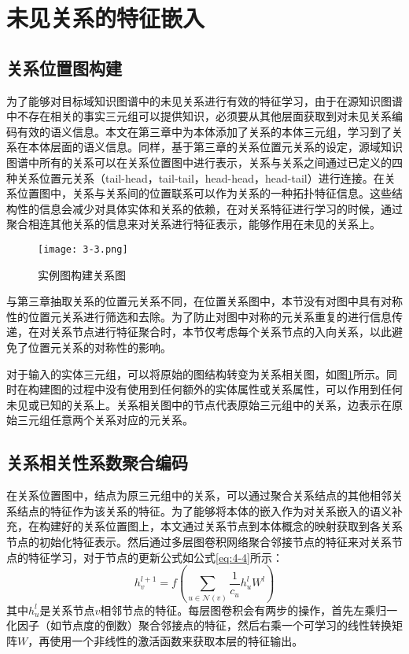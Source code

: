 \section{未见关系的特征嵌入}
\subsection{关系位置图构建}
为了能够对目标域知识图谱中的未见关系进行有效的特征学习，由于在源知识图谱中不存在相关的事实三元组可以提供知识，必须要从其他层面获取到对未见关系编码有效的语义信息。本文在第三章中为本体添加了关系的本体三元组，学习到了关系在本体层面的语义信息。同样，基于第三章的关系位置元关系的设定，源域知识图谱中所有的关系可以在关系位置图中进行表示，关系与关系之间通过已定义的四种关系位置元关系（tail-head，tail-tail，head-head，head-tail）进行连接。在关系位置图中，关系与关系间的位置联系可以作为关系的一种拓扑特征信息。这些结构性的信息会减少对具体实体和关系的依赖，在对关系特征进行学习的时候，通过聚合相连其他关系的信息来对关系进行特征表示，能够作用在未见的关系上。
\begin{figure}[h]
  \centering
  \texttt{[image: 3-3.png]}
  \caption{实例图构建关系图}
  \label{fig:3-3}
\end{figure}

与第三章抽取关系的位置元关系不同，在位置关系图中，本节没有对图中具有对称性的位置元关系进行筛选和去除。为了防止对图中对称的元关系重复的进行信息传递，在对关系节点进行特征聚合时，本节仅考虑每个关系节点的入向关系，以此避免了位置元关系的对称性的影响。

对于输入的实体三元组，可以将原始的图结构转变为关系相关图，如图\ref{fig:3-3}所示。同时在构建图的过程中没有使用到任何额外的实体属性或关系属性，可以作用到任何未见或已知的关系上。关系相关图中的节点代表原始三元组中的关系，边表示在原始三元组任意两个关系对应的元关系。

\subsection{关系相关性系数聚合编码}
在关系位置图中，结点为原三元组中的关系，可以通过聚合关系结点的其他相邻关系结点的特征作为该关系的特征。为了能够将本体的嵌入作为对关系嵌入的语义补充，在构建好的关系位置图上，本文通过关系节点到本体概念的映射获取到各关系节点的初始化特征表示。然后通过多层图卷积网络聚合邻接节点的特征来对关系节点的特征学习，对于节点的更新公式如公式\ref{eq:4-4}所示：
\begin{equation}
  h_{v}^{l+1}= f\left( \sum_{u \in \mathcal{N}(v)} \frac{1}{c_{u}} h_{u}^{l} W^{l}\right) \label{eq:4-4}
\end{equation}
其中\(h_{u}^{l}\)是关系节点\(v\)相邻节点的特征。每层图卷积会有两步的操作，首先左乘归一化因子（如节点度的倒数）聚合邻接点的特征，然后右乘一个可学习的线性转换矩阵\(W\)，再使用一个非线性的激活函数来获取本层的特征输出。

